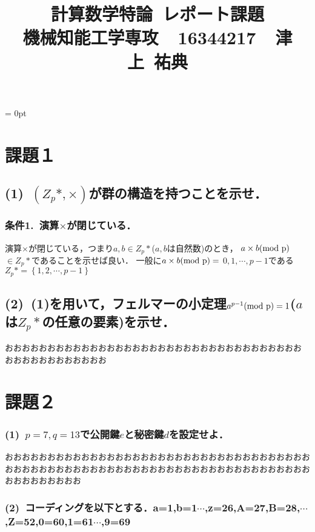 \documentclass[a4paper,12pt]{jarticle}
\begin{document}
%
\title{\vspace{-30mm}  計算数学特論~レポート課題 \\  機械知能工学専攻~~16344217~~津上~祐典}
\date{}
%
\maketitle
%
\vspace{-30mm}
\parindent = 0pt %
%
\section*{課題１}
\vspace{-3mm}
\subsection*{(1)~$(Z_p*,\times)$が群の構造を持つことを示せ．}
\subsubsection*{条件1.~演算$\times$が閉じている．}
\vspace{-5mm}
演算$\times$が閉じている，つまり$a,b\in Z_p*$($a,b$は自然数)のとき，
$a\times b(\rm{mod}~p)$ $\in Z_p*$であることを示せば良い．
一般に$a\times b(\rm{mod}~p)=$ $0,1,\cdots,p-1$である
$Z_p*=\left\{1,2,\cdots,p-1\right\}$
\vspace{-5mm}
\subsection*{(2)~(1)を用いて，フェルマーの小定理$a^{p-1}(\rm{mod}~p)=1$($a$は$Z_p*$の任意の要素)を示せ．}
おおおおおおおおおおおおおおおおおおおおおおおおおおおおおおおおおおお
おおおおおおおおおおおお
\vspace{-10mm}
\section*{課題２}
\vspace{-3mm}
\subsubsection*{(1)~$p=7,q=13$で公開鍵$e$と秘密鍵$d$を設定せよ．}
おおおおおおおおおおおおおおおおおおおおおおおおおおおおおおおおおおおお
おおおおおおおおおおおおおおおおおおおおおおおおおおおおおおおおおおおお
おおおおおおおおお
\vspace{-5mm}
\subsubsection*{(2)~コーディングを以下とする．a=1,b=1$\cdots$,z=26,A=27,B=28,$\cdots$,Z=52,0=60,1=61$\cdots$,9=69}
\end{document}

